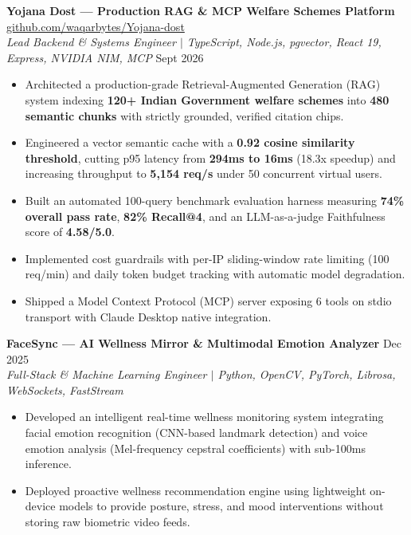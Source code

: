 \documentclass[10pt,letterpaper]{article}
\begin{document}
\textbf{Yojana Dost — Production RAG \& MCP Welfare Schemes Platform} \hfill \href{https://github.com/waqarbytes/Yojana-dost}{github.com/waqarbytes/Yojana-dost} \\
\textit{Lead Backend \& Systems Engineer $|$ TypeScript, Node.js, pgvector, React 19, Express, NVIDIA NIM, MCP} \hfill Sept 2026
\begin{itemize}
    \item Architected a production-grade Retrieval-Augmented Generation (RAG) system indexing \textbf{120+ Indian Government welfare schemes} into \textbf{480 semantic chunks} with strictly grounded, verified citation chips.
    \item Engineered a vector semantic cache with a \textbf{0.92 cosine similarity threshold}, cutting p95 latency from \textbf{294ms to 16ms} (18.3x speedup) and increasing throughput to \textbf{5,154 req/s} under 50 concurrent virtual users.
    \item Built an automated 100-query benchmark evaluation harness measuring \textbf{74\% overall pass rate}, \textbf{82\% Recall@4}, and an LLM-as-a-judge Faithfulness score of \textbf{4.58/5.0}.
    \item Implemented cost guardrails with per-IP sliding-window rate limiting (100 req/min) and daily token budget tracking with automatic model degradation.
    \item Shipped a Model Context Protocol (MCP) server exposing 6 tools on stdio transport with Claude Desktop native integration.
\end{itemize}

\vspace{3pt}

\textbf{FaceSync — AI Wellness Mirror \& Multimodal Emotion Analyzer} \hfill Dec 2025 \\
\textit{Full-Stack \& Machine Learning Engineer $|$ Python, OpenCV, PyTorch, Librosa, WebSockets, FastStream}
\begin{itemize}
    \item Developed an intelligent real-time wellness monitoring system integrating facial emotion recognition (CNN-based landmark detection) and voice emotion analysis (Mel-frequency cepstral coefficients) with sub-100ms inference.
    \item Deployed proactive wellness recommendation engine using lightweight on-device models to provide posture, stress, and mood interventions without storing raw biometric video feeds.
\end{itemize}
\end{document}

